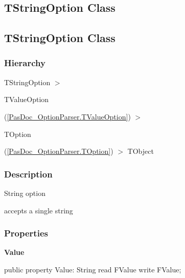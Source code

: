 \documentclass{report}
\newif\ifpdf
\begin{document}
\subsection*{\large{\textbf{TStringOption Class}}\normalsize\hspace{1ex}\hrulefill}
\else
\subsection*{TStringOption Class}
\fi
\label{PasDoc_OptionParser.TStringOption}
\subsubsection*{\large{\textbf{Hierarchy}}\normalsize\hspace{1ex}\hfill}
TStringOption {$>$} \begin{ttfamily}TValueOption\end{ttfamily}(\ref{PasDoc_OptionParser.TValueOption}) {$>$} \begin{ttfamily}TOption\end{ttfamily}(\ref{PasDoc_OptionParser.TOption}) {$>$} 
TObject
\subsubsection*{\large{\textbf{Description}}\normalsize\hspace{1ex}\hfill}
String option\hfill\vspace*{1ex}

 accepts a single string\subsubsection*{\large{\textbf{Properties}}\normalsize\hspace{1ex}\hfill}
\begin{list}{}{
\setlength{\itemindent}{0cm}
\setlength{\listparindent}{0cm}
\setlength{\leftmargin}{\evensidemargin}
\addtolength{\leftmargin}{\tmplength}
\settowidth{\labelsep}{X}
\addtolength{\leftmargin}{\labelsep}
\setlength{\labelwidth}{\tmplength}
}
\label{PasDoc_OptionParser.TStringOption-Value}
\item[\textbf{Value}\hfill]
\ifpdf
\begin{flushleft}
\fi
\begin{ttfamily}
public property Value: String read FValue write FValue;\end{ttfamily}

\ifpdf
\end{flushleft}
\fi


\par  \end{list}
\end{document}
